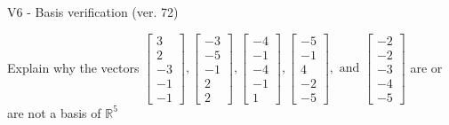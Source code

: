 \begin{exercise}
  \begin{exerciseTitle}V6 - Basis verification (ver. 72)\end{exerciseTitle}
  \begin{exerciseStatement}
    Explain why the vectors \(\left[\begin{array}{r}
3 \\
2 \\
-3 \\
-1 \\
-1
\end{array}\right] , \left[\begin{array}{r}
-3 \\
-5 \\
-1 \\
2 \\
2
\end{array}\right] , \left[\begin{array}{r}
-4 \\
-1 \\
-4 \\
-1 \\
1
\end{array}\right] , \left[\begin{array}{r}
-5 \\
-1 \\
4 \\
-2 \\
-5
\end{array}\right] , \text{ and } \left[\begin{array}{r}
-2 \\
-2 \\
-3 \\
-4 \\
-5
\end{array}\right]\) are or are not a basis of \(\mathbb{R}^5\)	



\end{exerciseStatement}
\end{exercise}
